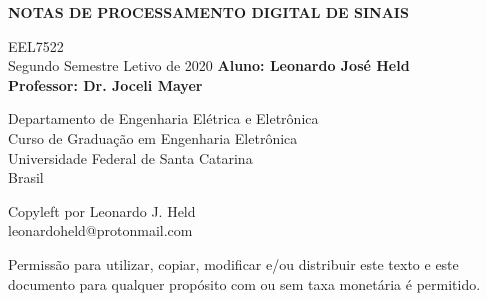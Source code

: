 \documentclass[12pt, a4paper]{report}
\begin{document}
\begin{titlepage}
    \begin{center}
        \vspace*{1cm}
        \Huge
        \textbf{NOTAS DE PROCESSAMENTO DIGITAL DE SINAIS}
             
        \vspace{3cm}
        EEL7522 \\
        Segundo Semestre Letivo de 2020 
        \vfill
        \Large
        \textbf{Aluno: Leonardo José Held}\\
        \textbf{Professor: Dr. Joceli Mayer}
        \vspace{0.8cm}

        Departamento de Engenharia Elétrica e Eletrônica\\
        Curso de Graduação em Engenharia Eletrônica\\
        Universidade Federal de Santa Catarina\\
        Brasil\\                     
    \end{center}
 \end{titlepage}

 \Large

 \tableofcontents

 \newpage
 \normalsize

 \vspace{1cm}
 Copyleft  por Leonardo J. Held \\leonardoheld@protonmail.com

\Large
 Permissão para utilizar, copiar, modificar e/ou distribuir este texto e este documento para qualquer propósito com ou sem taxa monetária é permitido.

 
 
\end{document}
